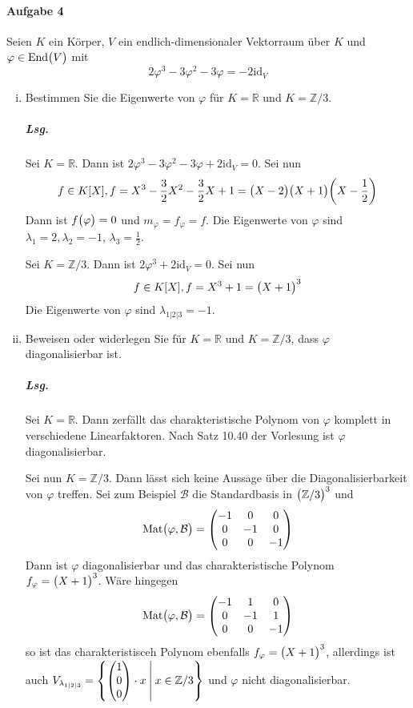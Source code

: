 \documentclass{scrreprt}
\newcommand\End{\text{End}}
\newcommand\id{\text{id}}
\newcommand\Mat{\text{Mat}}
\begin{document}
\paragraph{Aufgabe 4} Seien $K$ ein Körper, $V$ ein endlich-dimensionaler
Vektorraum über $K$ und $\varphi \in \End\qty\big(V)$ mit
\[
  2 \varphi^3 - 3 \varphi^2 - 3 \varphi = -2 \id_V
\]
\begin{enumerate}[(i)]
\item Bestimmen Sie die Eigenwerte von $\varphi$ für $K = \mathbb{R}$
  und $K = \mathbb{Z} / 3$.

  \subparagraph{Lsg.} Sei $K = \mathbb{R}$.
  Dann ist $2 \varphi^3 - 3 \varphi^2 - 3 \varphi + 2 \id_V = 0$.
  Sei nun
  \[
    f \in K\qty[X], f = X^3 - \frac{3}{2}X^2 - \frac{3}{2}X + 1 =
    \qty\big(X - 2)\qty\big(X + 1)\qty(X - \frac{1}{2})
  \]
  Dann ist $f\qty\big(\varphi) = 0$ und $m_{\varphi} = f_{\varphi} = f$.
  Die Eigenwerte von $\varphi$ sind $\lambda_1 = 2, \lambda_2 = -1$,
  $\lambda_3 = \frac{1}{2}$.

  Sei $K = \mathbb{Z}/3$.
  Dann ist $2 \varphi^3 + 2 \id_V = 0$.
  Sei nun
  \[
    f \in K\qty[X], f = X^3 + 1 =
    \qty\big(X + 1)^3
  \]
  Die Eigenwerte von $\varphi$ sind $\lambda_{1|2|3} = -1$.

\item Beweisen oder widerlegen Sie für $K = \mathbb{R}$ und
  $K = \mathbb{Z}/3$, dass $\varphi$ diagonalisierbar ist.

  \subparagraph{Lsg.} Sei $K = \mathbb{R}$.
  Dann zerfällt das charakteristische Polynom von $\varphi$ komplett in
  verschiedene Linearfaktoren.
  Nach Satz 10.40 der Vorlesung ist $\varphi$ diagonalisierbar.

  Sei nun $K = \mathbb{Z}/3$.
  Dann lässt sich keine Aussage über die Diagonalisierbarkeit von $\varphi$
  treffen.
  Sei zum Beispiel $\mathcal{B}$ die Standardbasis in $\qty\big(\mathbb{Z}/3)^3$
  und
  \[
    \Mat\qty\big(\varphi, \mathcal{B}) = \begin{pmatrix}
      -1 & 0 & 0 \\
      0 & -1 & 0 \\
      0 & 0 & -1 \\
    \end{pmatrix}
  \]
  Dann ist $\varphi$ diagonalisierbar und das charakteristische Polynom
  $f_{\varphi} = \qty\big(X + 1)^3$.
  Wäre hingegen
  \[
    \Mat\qty\big(\varphi, \mathcal{B}) = \begin{pmatrix}
      -1 & 1 & 0 \\
      0 & -1 & 1 \\
      0 & 0 & -1 \\
    \end{pmatrix}
  \]
  so ist das charakteristisceh Polynom ebenfalls
  $f_{\varphi} = \qty\big(X + 1)^3$, allerdings ist auch
  $V_{\lambda_{1|2|3}} = \qty{
    \begin{pmatrix}1\\0\\0\end{pmatrix} \cdot x
    \:\middle|\:
    x \in \mathbb{Z}/3
  }$ und $\varphi$ nicht diagonalisierbar.

\end{enumerate}
\end{document}
